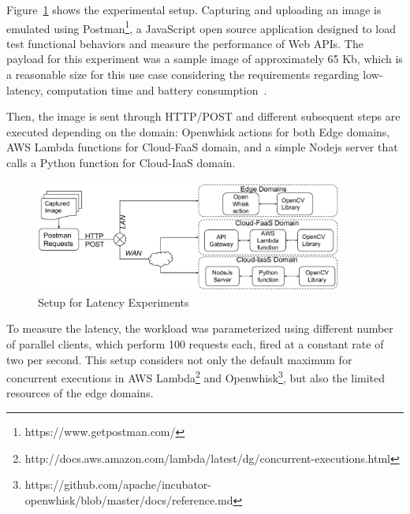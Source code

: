 Figure~\ref{fig:exp-setup1} shows the experimental setup. Capturing and uploading an image is emulated using Postman\footnote{https://www.getpostman.com/}, a JavaScript open source application designed to load test functional behaviors and measure the performance of Web APIs. The  payload for this experiment was a sample image of approximately 65 Kb, which is a reasonable size for this use case considering the requirements regarding low-latency, computation time and battery consumption~\cite{rodriguez16mobile}. 

Then, the image is sent through HTTP/POST and different subsequent steps are executed depending on the domain: Openwhisk actions for both Edge domains, AWS Lambda functions for Cloud-FaaS domain, and a simple Nodejs server that calls a Python function for Cloud-IaaS domain.



\begin{figure}
	
	\centering
	\includegraphics[width=0.9\textwidth]{figs/experimental-setup.pdf}
	\caption{Setup for Latency Experiments}
	\label{fig:exp-setup1}
\end{figure}


To measure the latency, the workload was parameterized using different number of parallel clients, which perform 100 requests each, fired at a constant rate of two per second. This setup considers not only the default maximum for concurrent executions in AWS Lambda\footnote{http://docs.aws.amazon.com/lambda/latest/dg/concurrent-executions.html} and Openwhisk\footnote{https://github.com/apache/incubator-openwhisk/blob/master/docs/reference.md}, but also the limited resources of the edge domains. 

